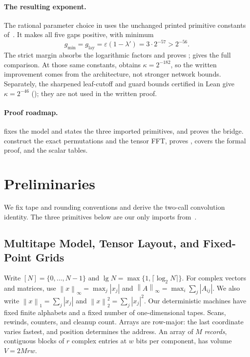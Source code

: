 \documentclass[11pt]{article}
\theoremstyle{definition}
\renewcommand{\label}[1]{}%
\newcommand{\eps}{\varepsilon}
\newcommand{\norm}[1]{\left\lVert #1 \right\rVert}
\newcommand{\abs}[1]{\left\lvert #1 \right\rvert}
\begin{document}
\paragraph{The resulting exponent.}
The rational parameter choice in  uses the unchanged printed primitive constants of~\cite{OAI26}.
It makes all five gaps positive, with minimum
\[
 g_{\min}=g_{\mathrm{lay}}=\eps(1-\lambda')
 =3\cdot2^{-57}>2^{-56}.
\]
The strict margin absorbs the logarithmic factors and proves ;  gives the full comparison.
At those same constants, \cite{OAI26} obtains $\kappa=2^{-182}$, so the written improvement comes from the architecture, not stronger network bounds.
Separately, the sharpened leaf-cutoff and guard bounds certified in Lean give $\kappa=2^{-46}$ (); they are not used in the written proof.

\paragraph{Proof roadmap.}
 fixes the model and states the three imported primitives, and  proves the bridge.
 construct the exact permutations and the tensor FFT,  proves ,  covers the formal proof, and  the scalar tables.

\endgroup
\clearpage


\section{Preliminaries}\label{sec:prelim}

We fix tape and rounding conventions and derive the two-call convolution
identity. The three primitives below are our only imports from~\cite{OAI26}.

\subsection{Multitape Model, Tensor Layout, and Fixed-Point Grids}
\label{sec:prelim-model}

Write $[N]=\{0,\ldots,N-1\}$ and $\lg N=\max\{1,\lceil\log_2N\rceil\}$.
For complex vectors and matrices, use
$\norm{x}_\infty=\max_j\abs{x_j}$ and
$\norm{A}_\infty=\max_i\sum_j\abs{A_{ij}}$.
We also write $\norm{x}_1=\sum_j\abs{x_j}$ and
$\norm{x}_2^2=\sum_j\abs{x_j}^2$.
Our deterministic machines have fixed finite alphabets and a fixed number of
one-dimensional tapes. Scans, rewinds, counters, and cleanup count.
Arrays are row-major: the last coordinate varies fastest, and position
determines the address. An array of $M$ \emph{records}, contiguous blocks of
$r$ complex entries at $w$ bits per component, has volume $V=2Mrw$.
\end{document}
